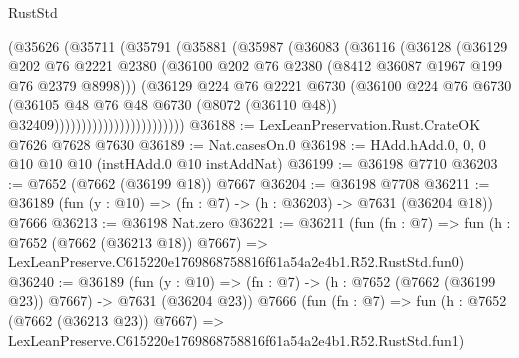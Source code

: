 \begin{lexlean}{RustStd}
\begin{coremodule}
                              (@35626
                                (@35711
                                  (@35791
                                    (@35881
                                      (@35987
                                        (@36083
                                          (@36116
                                            (@36128
                                              (@36129
                                                @202
                                                @76
                                                @2221
                                                @2380
                                                (@36100
                                                  @202
                                                  @76
                                                  @2380
                                                  (@8412 @36087 @1967 @199 @76 @2379 @8998)))
                                              (@36129
                                                @224
                                                @76
                                                @2221
                                                @6730
                                                (@36100
                                                  @224
                                                  @76
                                                  @6730
                                                  (@36105
                                                    @48
                                                    @76
                                                    @48
                                                    @6730
                                                    (@8072 (@36110 @48))
                                                    @32409))))))))))))))))))))))))
@36188 := LexLeanPreservation.Rust.CrateOK @7626 @7628 @7630
@36189 := Nat.casesOn.{0}
@36198 := HAdd.hAdd.{0, 0, 0} @10 @10 @10 (instHAdd.{0} @10 instAddNat)
@36199 := @36198 @7710
@36203 := @7652 (@7662 (@36199 @18)) @7667
@36204 := @36198 @7708
@36211 := @36189 (fun (y : @10) => (fn : @7) -> (h : @36203) -> @7631 (@36204 @18)) @7666
@36213 := @36198 Nat.zero
@36221 := @36211
    (fun (fn : @7) =>
    fun (h : @7652 (@7662 (@36213 @18)) @7667) =>
    LexLeanPreserve.C615220e1769868758816f61a54a2e4b1.R52.RustStd.fun0)
@36240 := @36189
    (fun (y : @10) => (fn : @7) -> (h : @7652 (@7662 (@36199 @23)) @7667) -> @7631 (@36204 @23))
    @7666
    (fun (fn : @7) =>
    fun (h : @7652 (@7662 (@36213 @23)) @7667) =>
    LexLeanPreserve.C615220e1769868758816f61a54a2e4b1.R52.RustStd.fun1)

\end{coremodule}
\end{lexlean}
